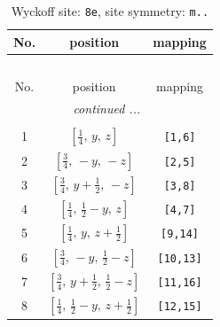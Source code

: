 \documentclass[fleqn,8pt]{jsarticle}
\begin{document}
\begin{longtable}{ccc}
\caption{Wyckoff site: {\tt 8e}, site symmetry: {\tt m..}}
 \\
 \hline \hline
No. & position & mapping \\ \hline \endfirsthead

\multicolumn{2}{l}{\tablename\ \thetable{}} \\
 \hline \hline
No. & position & mapping \\ \hline \endhead

 \hline \hline
\multicolumn{2}{r}{\footnotesize\it continued ...} \\ \endfoot

 \hline \hline
\multicolumn{2}{r}{} \\ \endlastfoot

1 & $\left[ \frac{1}{4},\, y,\, z \right]$ & {\tt [1,6]} \\ \hline
2 & $\left[ \frac{3}{4},\, - y,\, - z \right]$ & {\tt [2,5]} \\ \hline
3 & $\left[ \frac{3}{4},\, y + \frac{1}{2},\, - z \right]$ & {\tt [3,8]} \\ \hline
4 & $\left[ \frac{1}{4},\, \frac{1}{2} - y,\, z \right]$ & {\tt [4,7]} \\ \hline
5 & $\left[ \frac{1}{4},\, y,\, z + \frac{1}{2} \right]$ & {\tt [9,14]} \\ \hline
6 & $\left[ \frac{3}{4},\, - y,\, \frac{1}{2} - z \right]$ & {\tt [10,13]} \\ \hline
7 & $\left[ \frac{3}{4},\, y + \frac{1}{2},\, \frac{1}{2} - z \right]$ & {\tt [11,16]} \\ \hline
8 & $\left[ \frac{1}{4},\, \frac{1}{2} - y,\, z + \frac{1}{2} \right]$ & {\tt [12,15]} \\
\end{longtable}
\renewcommand{\arraystretch}{1.2}
\end{document}
